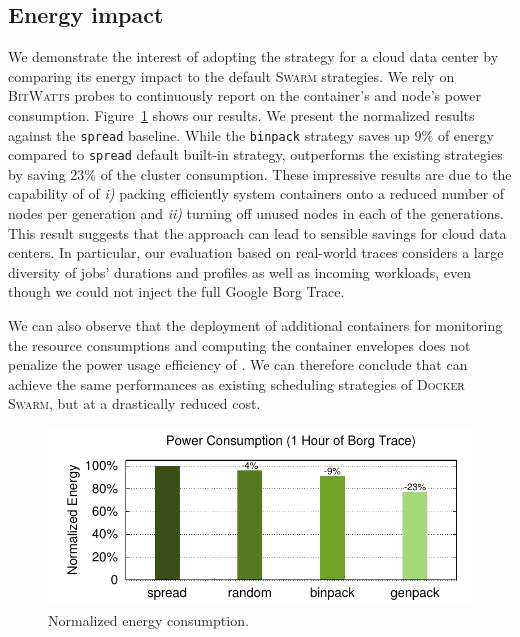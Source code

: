 \subsection{Energy impact}
\label{subsec:eval:energy}

We demonstrate the interest of adopting the \GP strategy for a cloud data center by comparing its energy impact to the default \textsc{Swarm} strategies.
We rely on \textsc{BitWatts} probes to continuously report on the container's and node's power consumption.
Figure~\ref{fig:energy:joules} shows our results.
We present the normalized results against the \texttt{spread} baseline.
While the \texttt{binpack} strategy saves up $9\%$ of energy compared to \texttt{spread} default built-in strategy, \GP outperforms the existing strategies by saving $23\%$ of the cluster consumption.
These impressive results are due to the capability of \GP of \emph{i)} packing efficiently system containers onto a reduced number of nodes per generation and \emph{ii)} turning off unused nodes in each of the generations.
This result suggests that the \GP approach can lead to sensible savings for cloud data centers.
In particular, our evaluation based on real-world traces considers a large diversity of jobs' durations and profiles as well as incoming workloads, even though we could not inject the full Google Borg Trace.

We can also observe that the deployment of additional containers for monitoring the resource consumptions and computing the container envelopes does not penalize the power usage efficiency of \GP.
We can therefore conclude that \GP{} can achieve the same performances as existing scheduling strategies of \textsc{Docker Swarm}, but at a drastically reduced cost.

\begin{figure}[t!]
  \centering
  \includegraphics[]{Figures/plots/energy/energy_joule}
  \caption{Normalized energy consumption.}
  \label{fig:energy:joules}
\end{figure}
